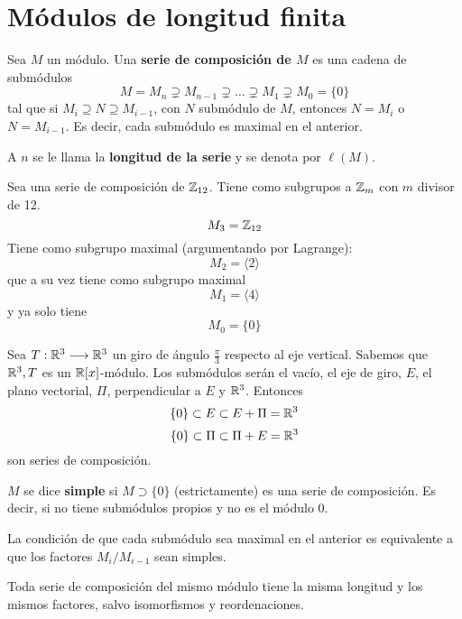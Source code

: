\section{Módulos de longitud finita}

\begin{df}
  Sea \(M\) un módulo. Una \textbf{serie de composición de \(M\)}
  es una cadena de submódulos
  \[
    M=M_n\supsetneq M_{n-1}\supsetneq\ldots\supsetneq M_1
    \supsetneq M_0=\{0\}
  \]
  tal que si \(M_i\supseteq N\supseteq M_{i-1}\), con \(N\) submódulo de \(M\),
  entonces \(N=M_i\) o \(N=M_{i-1}\). Es decir, cada submódulo es maximal
  en el anterior.

  A \(n\) se le llama la \textbf{longitud de la serie} y se denota por \(\ell(M)\).
\end{df}

\begin{ejemplo}
  Sea una serie de composición de \(\mathbb{Z}_{12}\). Tiene como subgrupos
  a \(\mathbb{Z}_m\) con \(m\) divisor de 12.
  \[
    M_3=\mathbb{Z}_{12}
  \]
  Tiene como subgrupo maximal (argumentando por Lagrange):
  \[
    M_2=\langle 2 \rangle
  \]
  que a su vez tiene como subgrupo maximal
  \[
    M_1=\langle 4\rangle
  \]
  y ya solo tiene
  \[
    M_0=\{0\}
  \]
\end{ejemplo}

\begin{ejemplo}
  Sea \(T: \mathbb{R}^3 \longrightarrow \mathbb{R}^3\) un giro de ángulo \(\frac{\pi}{3}\) respecto al eje
  vertical. Sabemos que \(\mathbb{R}^3, T\) es un \(\mathbb{R}[x]\)-módulo. Los submódulos serán el vacío,
  el eje de giro, \(E\), el plano vectorial, \(\Pi\), perpendicular a \(E\) y \(\mathbb{R}^3\).
  Entonces
  \[\{0\} \subset E \subset E + \Pi = \mathbb{R}^3\]
  \[\{0\} \subset \Pi \subset \Pi + E = \mathbb{R}^3\]
  son series de composición. 
\end{ejemplo}

\begin{df}
  \(M\) se dice \textbf{simple} si \(M\supset\{0\}\) (estrictamente) es una serie de
  composición.
  Es decir, si no tiene submódulos propios y no es el módulo 0.
\end{df}

\begin{prop}
  La condición de que cada submódulo sea maximal en el anterior es equivalente
  a que los factores \(M_i/M_{i-1}\) sean simples.
\end{prop}

\begin{teo}
  Toda serie de composición del mismo módulo tiene la misma longitud
  y los mismos factores, salvo isomorfismos y reordenaciones.
\end{teo}


